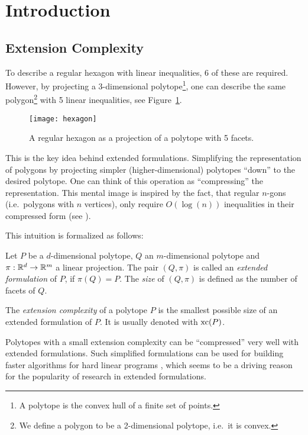 \section{Introduction}

\subsection{Extension Complexity}

To describe a regular hexagon with linear inequalities, 6 of these are required. However, by projecting a 3-dimensional polytope\footnote{A polytope is the convex hull of a finite set of points.}, one can describe the same polygon\footnote{We define a polygon to be a 2-dimensional polytope, i.e.\ it is convex.} with 5 linear inequalities, see Figure~\ref{fig:hexagon}.

\begin{figure}[ht]
  \centering
  \texttt{[image: hexagon]}
  \caption{A regular hexagon as a projection of a polytope with 5 facets. \cite[Figure 1]{kwan2020extension}}
  \label{fig:hexagon}
\end{figure}

This is the key idea behind extended formulations. Simplifying the representation of polygons by projecting simpler (higher-dimensional) polytopes ``down'' to the desired polytope.
One can think of this operation as ``compressing'' the representation. This mental image is inspired by the fact, that regular $n$-gons (i.e.\ polygons with $n$ vertices), only require $O(\log(n))$ inequalities in their compressed form (see \cite{kaibel2010constructing}).

This intuition is formalized as follows:

\begin{definition}
  Let $P$ be a $d$-dimensional polytope, $Q$ an $m$-dimensional polytope and $\pi:\mathbb{R}^d \to \mathbb{R}^m$ a linear projection.
  The pair $(Q,\pi)$ is called an \emph{extended formulation} of $P$, if $\pi(Q)=P$. The \emph{size} of $(Q,\pi)$ is defined as the number of facets of $Q$.
\end{definition}

\begin{definition}
  The \emph{extension complexity} of a polytope $P$ is the smallest possible size of an extended formulation of $P$. It is usually denoted with $\operatorname{xc}(P)$.
\end{definition}

Polytopes with a small extension complexity can be ``compressed'' very well with extended formulations.
Such simplified formulations can be used for building faster algorithms for hard linear programs \cite{yannakakis1991expressing}, which seems to be a driving reason for the popularity of research in extended formulations.


